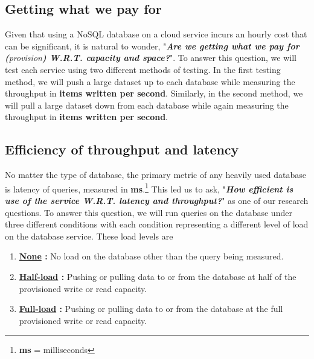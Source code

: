
\subsection{Getting what we pay for}

Given that using a NoSQL database on a cloud service incurs an hourly cost that can be significant, it is natural to wonder, "\emph{\textbf{Are we getting what we pay for (}provision\textbf{) W.R.T. capacity and space?}}".  To answer this question, we will test each service using two different methods of testing.  In the first testing method, we will push a large dataset up to each database while measuring the throughput in \textbf{items written per second}.  Similarly, in the second method, we will pull a large dataset down from each database while again measuring the throughput in \textbf{items written per second}.  



\subsection{Efficiency of throughput and latency}

No matter the type of database, the primary metric of any heavily used database is latency of queries, measured in \textbf{ms}.\footnote{\textbf{ms} = milliseconds}  This led us to ask, "\emph{\textbf{How efficient is use of the service W.R.T. latency and throughput?}}" as one of our research questions.  To answer this question, we will run queries on the database under three different conditions with each condition representing a different level of load on the database service.  These load levels are

\vspace{0.1in}
\begin{spacing}{1.2}
\begin{enumerate}[label=\large{\textbf{3 - \Alph*}):}]
	\item \textbf{\underline{None} :} No load on the database other than the query being measured.
	\vspace{0.05in}
	\item \textbf{\underline{Half-load} :} Pushing or pulling data to or from the database at half of the provisioned write or read capacity.
	\vspace{0.05in}
	\item \textbf{\underline{Full-load} :} Pushing or pulling data to or from the database at the full provisioned write or read capacity.
\end{enumerate}
\end{spacing}


